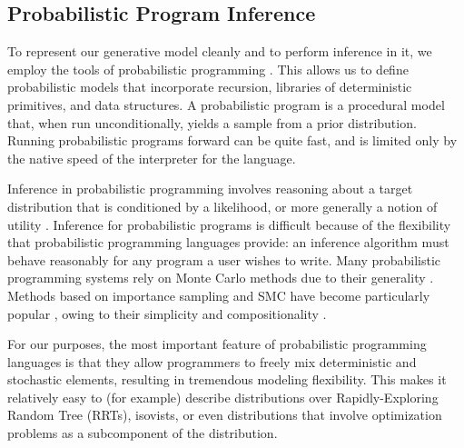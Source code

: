 \documentclass[twoside]{article}
\begin{document}
\subsection{Probabilistic Program Inference}

To represent our generative model cleanly and to perform inference in it, we employ the tools of probabilistic programming \cite{vandemeent2018introduction}. This allows us to define probabilistic models that incorporate recursion, libraries of deterministic primitives, and data structures. %
A probabilistic program is a procedural model that, when run unconditionally, yields a sample from a prior distribution. Running probabilistic programs forward can be quite fast, and is limited only by the native speed of the interpreter for the language.

Inference in probabilistic programming involves reasoning about a target distribution that is conditioned by a likelihood, or more generally a notion of utility \cite{vandemeent2018introduction}.
Inference for probabilistic programs is difficult because of the flexibility that probabilistic programming languages provide: an inference algorithm must behave reasonably for any program a user wishes to write. Many probabilistic programming systems rely on Monte Carlo methods due to their generality \cite{goodman08,milch05,pfeffer01,standevelopmentteam2014stan,venture}. Methods based on importance sampling and SMC have become particularly popular \cite{murray2013,todeschini2014biips,wood-aistats-2014,goodman2014dippl,ge2016turing}, owing to their simplicity and compositionality \cite{naesseth2015nested}.

For our purposes, the most important feature of probabilistic programming languages is that they allow programmers to freely mix deterministic and stochastic elements, resulting in tremendous modeling flexibility.  This makes it relatively easy to (for example) describe distributions over Rapidly-Exploring Random Tree (RRTs), isovists, or even distributions that involve optimization problems as a subcomponent of the distribution.

\end{document}
